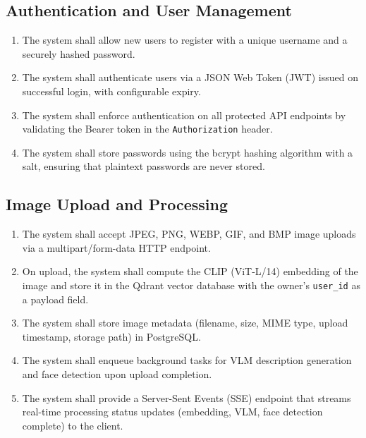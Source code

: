\documentclass[12pt,a4paper,oneside]{report}
\begin{document}
\subsection{Authentication and User Management}
\begin{enumerate}[leftmargin=*]
  \item The system shall allow new users to register with a unique username
        and a securely hashed password.
  \item The system shall authenticate users via a JSON Web Token (JWT)
        issued on successful login, with configurable expiry.
  \item The system shall enforce authentication on all protected API endpoints
        by validating the Bearer token in the \texttt{Authorization} header.
  \item The system shall store passwords using the bcrypt hashing algorithm
        with a salt, ensuring that plaintext passwords are never stored.
\end{enumerate}

\subsection{Image Upload and Processing}
\begin{enumerate}[leftmargin=*]
  \item The system shall accept JPEG, PNG, WEBP, GIF, and BMP image uploads
        via a multipart/form-data HTTP endpoint.
  \item On upload, the system shall compute the CLIP (ViT-L/14) embedding
        of the image and store it in the Qdrant vector database with the
        owner's \texttt{user\_id} as a payload field.
  \item The system shall store image metadata (filename, size, MIME type,
        upload timestamp, storage path) in PostgreSQL.
  \item The system shall enqueue background tasks for VLM description
        generation and face detection upon upload completion.
  \item The system shall provide a Server-Sent Events (SSE) endpoint that
        streams real-time processing status updates (embedding, VLM,
        face detection complete) to the client.
\end{enumerate}
\end{document}
